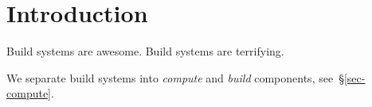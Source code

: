 \section{Introduction}\label{sec-intro}

Build systems are awesome. Build systems are terrifying.

We separate build systems into \emph{compute} and \emph{build} components,
see~\S\ref{sec-compute}.